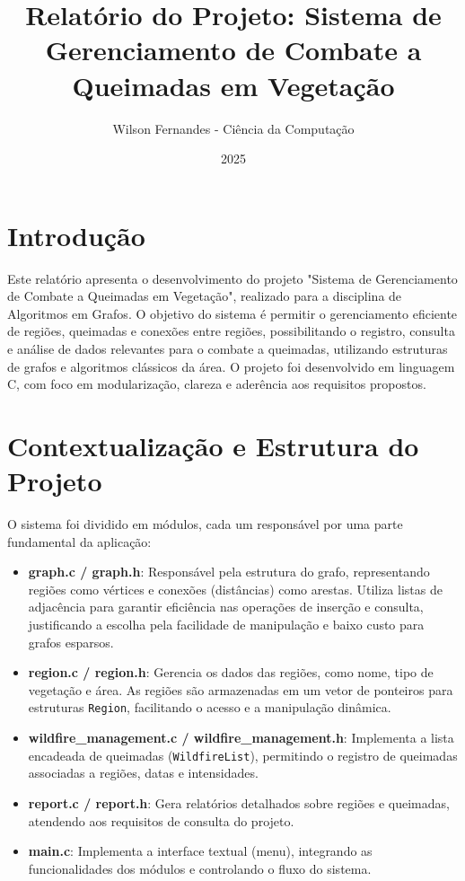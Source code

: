 \documentclass{article}
\begin{document}
\title{Relatório do Projeto: Sistema de Gerenciamento de Combate a Queimadas em Vegetação}
\author{Wilson Fernandes - Ciência da Computação}
\date{2025}

\maketitle

\section{Introdução}

Este relatório apresenta o desenvolvimento do projeto "Sistema de Gerenciamento de Combate a Queimadas em Vegetação", realizado para a disciplina de Algoritmos em Grafos. O objetivo do sistema é permitir o gerenciamento eficiente de regiões, queimadas e conexões entre regiões, possibilitando o registro, consulta e análise de dados relevantes para o combate a queimadas, utilizando estruturas de grafos e algoritmos clássicos da área. O projeto foi desenvolvido em linguagem C, com foco em modularização, clareza e aderência aos requisitos propostos.

\section{Contextualização e Estrutura do Projeto}

O sistema foi dividido em módulos, cada um responsável por uma parte fundamental da aplicação:

\begin{itemize}
    \item \textbf{graph.c / graph.h}: Responsável pela estrutura do grafo, representando regiões como vértices e conexões (distâncias) como arestas. Utiliza listas de adjacência para garantir eficiência nas operações de inserção e consulta, justificando a escolha pela facilidade de manipulação e baixo custo para grafos esparsos.
    \item \textbf{region.c / region.h}: Gerencia os dados das regiões, como nome, tipo de vegetação e área. As regiões são armazenadas em um vetor de ponteiros para estruturas \texttt{Region}, facilitando o acesso e a manipulação dinâmica.
    \item \textbf{wildfire\_management.c / wildfire\_management.h}: Implementa a lista encadeada de queimadas (\texttt{WildfireList}), permitindo o registro de queimadas associadas a regiões, datas e intensidades.
    \item \textbf{report.c / report.h}: Gera relatórios detalhados sobre regiões e queimadas, atendendo aos requisitos de consulta do projeto.
    \item \textbf{main.c}: Implementa a interface textual (menu), integrando as funcionalidades dos módulos e controlando o fluxo do sistema.
\end{itemize}
\end{document}
